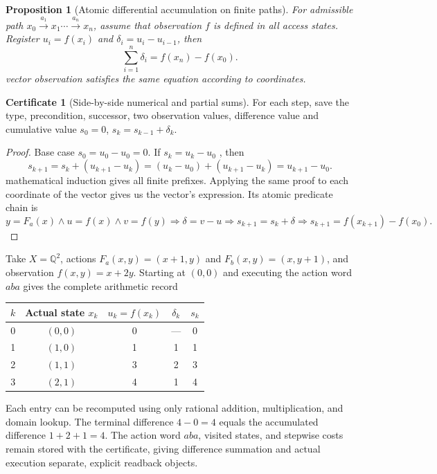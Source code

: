 \documentclass[12pt,a4paper,openany,notitlepage]{report}
\theoremstyle{plain}
\newtheorem{proposition}[theorem]{Proposition}
\theoremstyle{definition}
\newtheorem*{certificate}{Certificate}
\theoremstyle{remark}
\begin{document}
\begin{CJK*}
\begin{proposition}
[Atomic differential accumulation on finite paths]\label{exp:logic:telescoping}
For admissible path $x_0\xrightarrow{a_1}x_1\cdots\xrightarrow{a_n}x_n$, assume that observation $f$ is defined in all access states. Register $u_i=f(x_i)$ and $\delta_i=u_i-u_{i-1}$, then \[
 \sum_{i=1}^{n}\delta_i=f(x_n)-f(x_0).
\] vector observation satisfies the same equation according to coordinates.\end{proposition}
\begin{certificate}
[Side-by-side numerical and partial sums]For each step, save the type, precondition, successor, two observation values, difference value and cumulative value $s_0=0$, $s_k=s_{k-1}+\delta_k$.\end{certificate}
\begin{proof}
Base case $s_0=u_0-u_0=0$. If $s_k=u_k-u_0$ , then \[
 s_{k+1}=s_k+(u_{k+1}-u_k)
 =(u_k-u_0)+(u_{k+1}-u_k)=u_{k+1}-u_0.
\] mathematical induction gives all finite prefixes. Applying the same proof to each coordinate of the vector gives us the vector's expression. Its atomic predicate chain is \[
 y=F_a(x)\land u=f(x)\land v=f(y)
 \Rightarrow\delta=v-u
 \Rightarrow s_{k+1}=s_k+\delta
 \Rightarrow s_{k+1}=f(x_{k+1})-f(x_0).
\]\end{proof}


Take $X=\mathbb Q^2$, actions $F_a(x,y)=(x+1,y)$ and $F_b(x,y)=(x,y+1)$, and observation $f(x,y)=x+2y$. Starting at $(0,0)$ and executing the action word $aba$ gives the complete arithmetic record
\begin{center}
\begin{tabular} {ccccc}
\toprule
$k$ & Actual state $x_k$ & $u_k=f(x_k)$ & $\delta_k$ & $s_k$ \\
\midrule
0 & $(0,0)$ & 0 & --- & 0 \\
1 & $(1,0)$ & 1 & 1 & 1 \\
2 & $(1,1)$ & 3 & 2 & 3 \\
3 & $(2,1)$ & 4 & 1 & 4 \\
\bottomrule
\end{tabular}
\end{center}
Each entry can be recomputed using only rational addition, multiplication, and domain lookup. The terminal difference $4-0=4$ equals the accumulated difference $1+2+1=4$. The action word $aba$, visited states, and stepwise costs remain stored with the certificate, giving difference summation and actual execution separate, explicit readback objects.


\end{CJK*}
\end{document}
